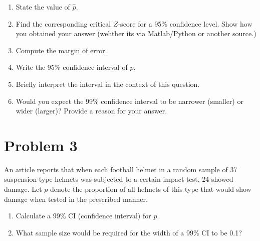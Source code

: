 \documentclass[11pt,twoside]{article}
\newcommand{\pts}[1]{\marginpar{ \small\hspace{0pt} \textit{[#1]} } }
\newcommand{\?}{\stackrel{?}{=}}
\begin{document}
  
  \begin{enumerate}[\bf (a)]
    \item State the value of $\hat p$. \pts{1}
    \vspace{2ex}
    
    \item Find the corresponding critical $Z$-score for a 95\% confidence level. Show how you obtained your answer (wehther its via Matlab/Python or another source.)\pts{1}
    \vspace{14ex}

    \item Compute the margin of error. \pts{2}
    \vspace{16ex}

    \item Write the 95\% confidence interval of $p$. \pts{2}
    \vspace{14ex}

    \item Briefly interpret the interval in the context of this question. \pts{2}
    \vspace{14ex}

    \item Would you expect the 99\% confidence interval to be narrower (smaller) or wider (larger)? Provide a reason for your answer. \pts{2}
  \end{enumerate}
  

 
\eject


\section*{Problem 3       }
An article reports that when each football helmet in a random sample of 37 suspension-type helmets was subjected to a certain impact test, 24 showed damage. Let $p$ denote the proportion of all helmets of this type that would show damage when tested in the prescribed manner.

\begin{enumerate}[\bf (a)]

\item  Calculate a 99\% CI (confidence interval) for $p$. \pts{6}
\vspace{60ex}

\item What sample size would be required for the width of a 99\% CI to be  0.1? \pts{4}
\end{enumerate}
\end{document}
